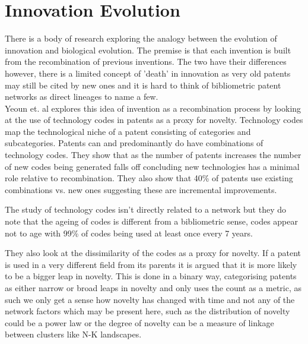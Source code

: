 \documentclass[12pt,journal,compsoc]{IEEEtran}
\begin{document}


\section{Innovation Evolution}
There is a body of research exploring the analogy between the evolution of innovation and biological evolution. The premise is that each invention is built from the recombination of previous inventions. The two have their differences however, there is a limited concept of 'death' in innovation as very old patents may still be cited by new ones and it is hard to think of bibliometric patent networks as direct lineages to name a few.
\\


Yeoun et. al \cite{youn2015invention} explores this idea of invention as a recombination process by looking at the use of technology codes in patents as a proxy for novelty. Technology codes map the technological niche of a patent consisting of categories and subcategories. Patents can and predominantly do have combinations of technology codes. They show that as the number of patents increases the number of new codes being generated falls off concluding new technologies has a minimal role relative to recombination. They also show that 40\% of patents use existing combinations vs. new ones suggesting these are incremental improvements. 

The study of technology codes isn't directly related to a network but they do note that the ageing of codes is different from a bibliometric sense, codes appear not to age with 99\% of codes being used at least once every 7 years. 

They also look at the dissimilarity of the codes as a proxy for novelty. If a patent is used in a very different field from its parents it is argued that it is more likely to be a bigger leap in novelty. This is done in a binary way, categorising patents as either narrow or broad leaps in novelty and only uses the count as a metric, as such we only get a sense how novelty has changed with time and not any of the network factors which may be present here, such as the distribution of novelty could be a power law or the degree of novelty can be a measure of linkage between clusters like N-K landscapes. 
\end{document}
